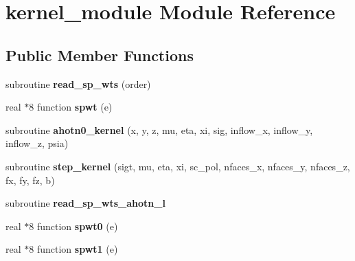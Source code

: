 \hypertarget{classkernel__module}{\section{kernel\+\_\+module Module Reference}
\label{classkernel__module}
}
\subsection*{Public Member Functions}
\begin{DoxyCompactItemize}
\item 
\hypertarget{classkernel__module_ac5350d99b77155ff299f25b6d70cea2d}{subroutine {\bfseries read\+\_\+sp\+\_\+wts} (order)}\label{classkernel__module_ac5350d99b77155ff299f25b6d70cea2d}

\item 
\hypertarget{classkernel__module_a6c7125e68f81cb0e7cd9f3e48abc126e}{real $\ast$8 function {\bfseries spwt} (e)}\label{classkernel__module_a6c7125e68f81cb0e7cd9f3e48abc126e}

\item 
\hypertarget{classkernel__module_a23d3af9299716bd83f7c2cd31d59bd4f}{subroutine {\bfseries ahotn0\+\_\+kernel} (x, y, z, mu, eta, xi, sig, inflow\+\_\+x, inflow\+\_\+y, inflow\+\_\+z, psia)}\label{classkernel__module_a23d3af9299716bd83f7c2cd31d59bd4f}

\item 
\hypertarget{classkernel__module_af428ae06d5e559edbf278d33f3628296}{subroutine {\bfseries step\+\_\+kernel} (sigt, mu, eta, xi, sc\+\_\+pol, nfaces\+\_\+x, nfaces\+\_\+y, nfaces\+\_\+z, fx, fy, fz, b)}\label{classkernel__module_af428ae06d5e559edbf278d33f3628296}

\item 
\hypertarget{classkernel__module_aa7cb328967dc7b6b33a0c922daed7cb7}{subroutine {\bfseries read\+\_\+sp\+\_\+wts\+\_\+ahotn\+\_\+l}}\label{classkernel__module_aa7cb328967dc7b6b33a0c922daed7cb7}

\item 
\hypertarget{classkernel__module_a0e94ea76b266be88663f608c0646f6d1}{real $\ast$8 function {\bfseries spwt0} (e)}\label{classkernel__module_a0e94ea76b266be88663f608c0646f6d1}

\item 
\hypertarget{classkernel__module_aa29c22ba87ecbc4ba8ab0d04c54783e0}{real $\ast$8 function {\bfseries spwt1} (e)}\label{classkernel__module_aa29c22ba87ecbc4ba8ab0d04c54783e0}


\end{DoxyCompactItemize}
